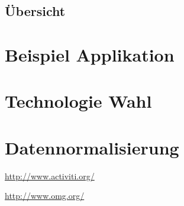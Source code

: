 \documentclass[paper=a4,twoside=false,BCOR=0mm,DIV=calc,fontsize=12pt]{scrartcl}
\begin{document}
\subsection{Übersicht}



\section{Beispiel Applikation}


\section{Technologie Wahl}




\section{Datennormalisierung}





\begin{thebibliography}{99}

 \url{http://www.activiti.org/}

 \url{http://www.omg.org/}




\end{thebibliography}
\end{document}
